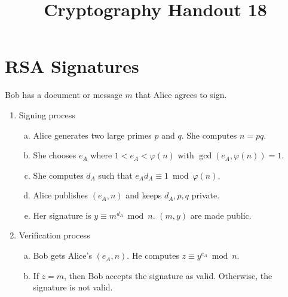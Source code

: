 \documentclass[12pt]{amsart}
\makeatletter
\def\subtitle#1{\gdef\@subtitle{#1}}
\def\@subtitle{}
\theoremstyle{plain}
\theoremstyle{definition}
\theoremstyle{remark}
\makeatother
\begin{document}
\onehalfspacing

\title[]{Cryptography Handout 18}
\subtitle{Digital Signatures (Guided Notes)}
\maketitle

\section{RSA Signatures}
\begin{framed}
Bob has a document or message $m$ that Alice agrees to sign.
\begin{enumerate}[1.]
	\item Signing process
		\begin{enumerate}[a.]
			\item Alice generates two large primes $p$ and $q$.  She computes $n = pq$.
			\item She chooses $e_A$ where $1 < e_A < \varphi(n)$ with $\gcd(e_A, \varphi(n)) = 1$.
			\item She computes $d_A$ such that $e_Ad_A \equiv 1 \bmod \varphi(n)$.
			\item Alice publishes $(e_A, n)$ and keeps $d_A, p, q$ private.
			\item Her signature is $y \equiv m^{d_A} \bmod n$.  $(m, y)$ are made public.
		\end{enumerate}
	\item Verification process
	\begin{enumerate}[a.]
		\item Bob gets Alice's $(e_A, n)$.  He computes $z \equiv y^{e_A} \bmod n$.
		\item If $z = m$, then Bob accepts the signature as valid.  Otherwise, the signature is not valid.
	\end{enumerate}
\end{enumerate}
\end{framed}
\end{document}
